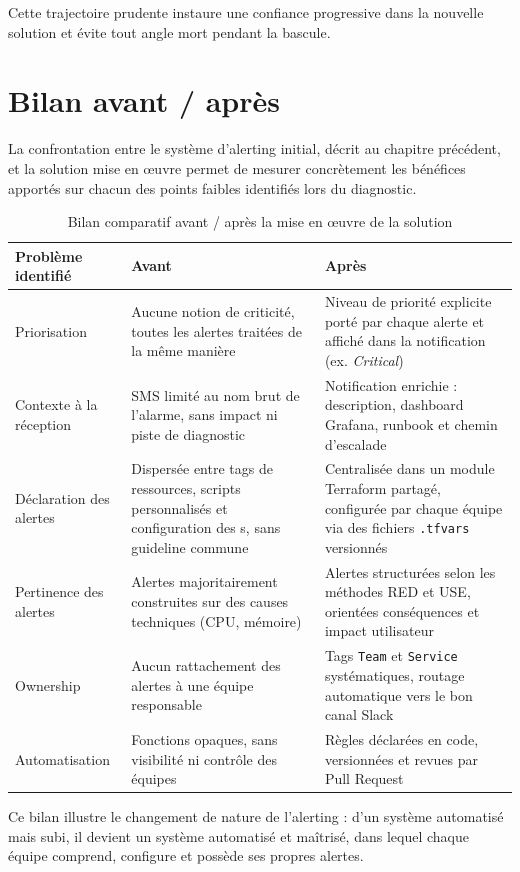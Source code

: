 Cette trajectoire prudente instaure une confiance progressive dans la nouvelle solution et évite tout
angle mort pendant la bascule.

\section{Bilan avant / après}

La confrontation entre le système d'alerting initial, décrit au chapitre précédent, et la solution mise
en œuvre permet de mesurer concrètement les bénéfices apportés sur chacun des points faibles
identifiés lors du diagnostic.

\begin{table}[h]
	\centering
	\caption{Bilan comparatif avant / après la mise en œuvre de la solution}
	\label{tab:bilan-avant-apres}
	\begin{tabular}{|p{}|p{}|p{}|}
		\hline
		\textbf{Problème identifié} & \textbf{Avant} & \textbf{Après} \\
		\hline
		Priorisation &
		Aucune notion de criticité, toutes les alertes traitées de la même manière &
		Niveau de priorité explicite porté par chaque alerte et affiché dans la notification (ex. \emph{Critical}) \\
		\hline
		Contexte à la réception &
		SMS limité au nom brut de l'alarme, sans impact ni piste de diagnostic &
		Notification enrichie : description, dashboard Grafana, runbook et chemin d'escalade \\
		\hline
		Déclaration des alertes &
		Dispersée entre tags de ressources, scripts personnalisés et configuration des \lexique{Lambda}s, sans guideline commune &
		Centralisée dans un module Terraform partagé, configurée par chaque équipe via des fichiers \texttt{.tfvars} versionnés \\
		\hline
		Pertinence des alertes &
		Alertes majoritairement construites sur des causes techniques (CPU, mémoire) &
		Alertes structurées selon les méthodes RED et USE, orientées conséquences et impact utilisateur \\
		\hline
		Ownership &
		Aucun rattachement des alertes à une équipe responsable &
		Tags \texttt{Team} et \texttt{Service} systématiques, routage automatique vers le bon canal Slack \\
		\hline
		Automatisation &
		Fonctions \lexique{Lambda} opaques, sans visibilité ni contrôle des équipes &
		Règles déclarées en code, versionnées et revues par Pull Request \\
		\hline
	\end{tabular}
\end{table}
\FloatBarrier

Ce bilan illustre le changement de nature de l'alerting : d'un système automatisé mais subi, il devient
un système automatisé et maîtrisé, dans lequel chaque équipe comprend, configure et possède ses
propres alertes.

